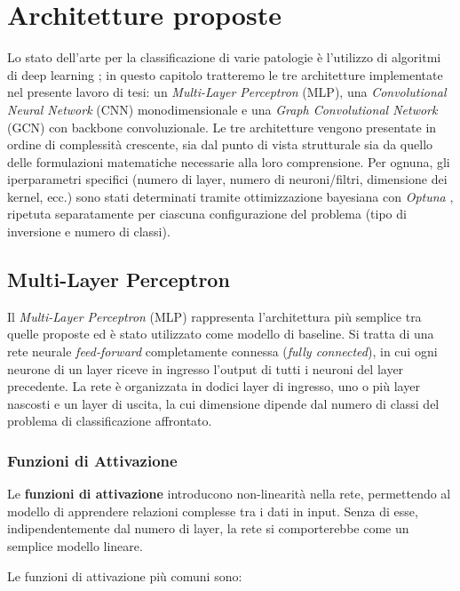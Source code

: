 \chapter{Architetture proposte}
\label{chap_6}
Lo stato dell'arte per la classificazione di varie patologie è l'utilizzo di algoritmi di deep learning \cite{goodfellow2016deep,hannun2019cardiologist}; in questo capitolo tratteremo le tre architetture implementate nel presente lavoro di tesi: un \emph{Multi-Layer Perceptron} (MLP), una \emph{Convolutional Neural Network} (CNN) monodimensionale e una \emph{Graph Convolutional Network} (GCN) con backbone convoluzionale. Le tre architetture vengono presentate in ordine di complessità crescente, sia dal punto di vista strutturale sia da quello delle formulazioni matematiche necessarie alla loro comprensione. Per ognuna, gli iperparametri specifici (numero di layer, numero di neuroni/filtri, dimensione dei kernel, ecc.) sono stati determinati tramite ottimizzazione bayesiana con \emph{Optuna} \cite{akiba2019optuna}, ripetuta separatamente per ciascuna configurazione del problema (tipo di inversione e numero di classi).

\section{Multi-Layer Perceptron}
\label{sec:mlp}

Il \emph{Multi-Layer Perceptron} (MLP) rappresenta l'architettura più semplice tra quelle proposte ed è stato utilizzato come modello di baseline. Si tratta di una rete neurale \textit{feed-forward} completamente connessa (\textit{fully connected}), in cui ogni neurone di un layer riceve in ingresso l'output di tutti i neuroni del layer precedente. La rete è organizzata in dodici layer di ingresso, uno o più layer nascosti e un layer di uscita, la cui dimensione dipende dal numero di classi del problema di classificazione affrontato.

\subsection{Funzioni di Attivazione}

Le \textbf{funzioni di attivazione} introducono non-linearità nella rete, permettendo al modello di apprendere relazioni complesse tra i dati in input. Senza di esse, indipendentemente dal numero di layer, la rete si comporterebbe come un semplice modello lineare.

Le funzioni di attivazione più comuni sono:

